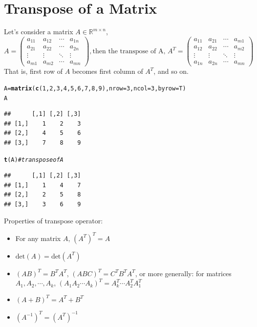 \documentclass[conference,final,11pt,technote,onecolumn]{IEEEtran}\usepackage[]{graphicx}\usepackage[]{color}
\makeatletter
\newcommand{\hlnum}[1]{\textcolor[rgb]{0.686,0.059,0.569}{#1}}%
\newcommand{\hlcom}[1]{\textcolor[rgb]{0.678,0.584,0.686}{\textit{#1}}}%
\newcommand{\hlstd}[1]{\textcolor[rgb]{0.345,0.345,0.345}{#1}}%
\newcommand{\hlkwb}[1]{\textcolor[rgb]{0.69,0.353,0.396}{#1}}%
\newcommand{\hlkwc}[1]{\textcolor[rgb]{0.333,0.667,0.333}{#1}}%
\newcommand{\hlkwd}[1]{\textcolor[rgb]{0.737,0.353,0.396}{\textbf{#1}}}%
\newenvironment{kframe}{%
 \def\at@end@of@kframe{}%
 \ifinner\ifhmode%
  \def\at@end@of@kframe{\end{minipage}}%
  \begin{minipage}{\columnwidth}%
 \fi\fi%
 \def\FrameCommand##1{\hskip\@totalleftmargin \hskip-\fboxsep
 \colorbox{shadecolor}{##1}\hskip-\fboxsep
     \hskip-\linewidth \hskip-\@totalleftmargin \hskip\columnwidth}%
 \MakeFramed {\advance\hsize-\width
   \@totalleftmargin\z@ \linewidth\hsize
   \@setminipage}}%
 {\par\unskip\endMakeFramed%
 \at@end@of@kframe}
\newenvironment{knitrout}{}{} %
\makeatother
\begin{document}
	\section{Transpose of a Matrix}
	\label{term:transpose_of_a_matrix}
Let's consider a matrix $A\in \mathbb{R}^{m\times n}$,
\[
A = \begin{pmatrix}
a_{11} & a_{12} & \cdots & a_{1n}\\
a_{21} & a_{22} & \cdots & a_{2n}\\
\vdots & \vdots & \ddots & \vdots \\
a_{m1} & a_{m2} & \cdots & a_{mn}
\end{pmatrix}, \text{then the transpose of A, }A^T = \begin{pmatrix}
a_{11} & a_{21} & \cdots & a_{m1}\\
a_{12} & a_{22} & \cdots & a_{m2}\\
\vdots & \vdots & \ddots & \vdots \\
a_{1n} & a_{2n} & \cdots & a_{mn}
\end{pmatrix}
\]
That is, first row of $A$ becomes first column of $A^T$, and so on.
\begin{knitrout}
\color{fgcolor}\begin{kframe}
\begin{alltt}
\hlstd{A} \hlkwb{=} \hlkwd{matrix}\hlstd{(}\hlkwd{c}\hlstd{(}\hlnum{1}\hlstd{,}\hlnum{2}\hlstd{,}\hlnum{3}\hlstd{,}\hlnum{4}\hlstd{,}\hlnum{5}\hlstd{,}\hlnum{6}\hlstd{,}\hlnum{7}\hlstd{,}\hlnum{8}\hlstd{,}\hlnum{9}\hlstd{),}\hlkwc{nrow}\hlstd{=}\hlnum{3}\hlstd{,}\hlkwc{ncol}\hlstd{=}\hlnum{3}\hlstd{,}\hlkwc{byrow}\hlstd{=T)}
\hlstd{A}
\end{alltt}
\begin{verbatim}
##      [,1] [,2] [,3]
## [1,]    1    2    3
## [2,]    4    5    6
## [3,]    7    8    9
\end{verbatim}
\begin{alltt}
\hlkwd{t}\hlstd{(A)} \hlcom{#transpose of A}
\end{alltt}
\begin{verbatim}
##      [,1] [,2] [,3]
## [1,]    1    4    7
## [2,]    2    5    8
## [3,]    3    6    9
\end{verbatim}
\end{kframe}
\end{knitrout}
Properties of transpose operator:
 \begin{itemize}
 \item For any matrix $A$, $(A^T)^T = A$
 \item $\text{det}(A) = \text{det}(A^T)$
 \item $(AB)^T = B^TA^T$, $(ABC)^T = C^TB^TA^T$, or more generally: for matrices $A_1, A_2, \cdots, A_k$, $(A_1A_2\cdots A_k)^T = A^T_k\cdots A^T_2A^T_1$
 \item $(A+B)^T = A^T + B^T$
 \item $(A^{-1})^T = (A^T)^{-1}$
 \end{itemize}
	
\end{document}
